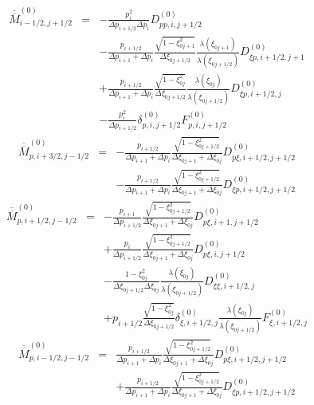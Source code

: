 \begin{eqnarray*}
\overline{\overline{M}}_{i-1/2,j+1/2}^{\left(0\right)} & = & -\frac{p_{i}^{2}}{\Delta p_{i+1/2}\Delta p_{i}}D_{pp,i,j+1/2}^{\left(0\right)}\\
 &  & -\frac{p_{i+1/2}}{\Delta p_{i+1}+\Delta p_{i}}\frac{\sqrt{1-\xi_{0j+1}^{2}}}{\Delta\xi_{0j+1/2}}\frac{\lambda\left(\xi_{0j+1}\right)}{\lambda\left(\xi_{0j+1/2}\right)}D_{\xi p,i+1/2,j+1}^{\left(0\right)}\\
 &  & +\frac{p_{i+1/2}}{\Delta p_{i+1}+\Delta p_{i}}\frac{\sqrt{1-\xi_{0j}^{2}}}{\Delta\xi_{0j+1/2}}\frac{\lambda\left(\xi_{0j}\right)}{\lambda\left(\xi_{0j+1/2}\right)}D_{\xi p,i+1/2,j}^{\left(0\right)}\\
 &  & -\frac{p_{i}^{2}}{\Delta p_{i+1/2}}\delta_{p,i,j+1/2}^{\left(0\right)}F_{p,i,j+1/2}^{\left(0\right)}\end{eqnarray*}
\begin{eqnarray*}
\overline{\overline{M}}_{p,i+3/2,j-1/2}^{\left(0\right)} & = & -\frac{p_{i+1/2}}{\Delta p_{i+1}+\Delta p_{i}}\frac{\sqrt{1-\xi_{0j+1/2}^{2}}}{\Delta\xi_{0j+1}+\Delta\xi_{0j}}D_{p\xi,i+1/2,j+1/2}^{\left(0\right)}\\
 &  & -\frac{p_{i+1/2}}{\Delta p_{i+1}+\Delta p_{i}}\frac{\sqrt{1-\xi_{0j+1/2}^{2}}}{\Delta\xi_{0j+1}+\Delta\xi_{0j}}D_{\xi p,i+1/2,j+1/2}^{\left(0\right)}\end{eqnarray*}
\begin{eqnarray*}
\overline{\overline{M}}_{p,i+1/2,j-1/2}^{\left(0\right)} & = & -\frac{p_{i+1}}{\Delta p_{i+1/2}}\frac{\sqrt{1-\xi_{0j+1/2}^{2}}}{\Delta\xi_{0j+1}+\Delta\xi_{0j}}D_{p\xi,i+1,j+1/2}^{\left(0\right)}\\
 &  & +\frac{p_{i}}{\Delta p_{i+1/2}}\frac{\sqrt{1-\xi_{0j+1/2}^{2}}}{\Delta\xi_{0j+1}+\Delta\xi_{0j}}D_{p\xi,i,j+1/2}^{\left(0\right)}\\
 &  & -\frac{1-\xi_{0j}^{2}}{\Delta\xi_{0j+1/2}\Delta\xi_{0j}}\frac{\lambda\left(\xi_{0j}\right)}{\lambda\left(\xi_{0j+1/2}\right)}D_{\xi\xi,i+1/2,j}^{\left(0\right)}\\
 &  & +p_{i+1/2}\frac{\sqrt{1-\xi_{0j}^{2}}}{\Delta\xi_{0j+1/2}}\delta_{\xi,i+1/2,j}^{\left(0\right)}\frac{\lambda\left(\xi_{0j}\right)}{\lambda\left(\xi_{0j+1/2}\right)}F_{\xi,i+1/2,j}^{\left(0\right)}\end{eqnarray*}
\begin{eqnarray*}
\overline{\overline{M}}_{p,i-1/2,j-1/2}^{\left(0\right)} & = & \frac{p_{i+1/2}}{\Delta p_{i+1}+\Delta p_{i}}\frac{\sqrt{1-\xi_{0j+1/2}^{2}}}{\Delta\xi_{0j+1}+\Delta\xi_{0j}}D_{p\xi,i+1/2,j+1/2}^{\left(0\right)}\\
 &  & +\frac{p_{i+1/2}}{\Delta p_{i+1}+\Delta p_{i}}\frac{\sqrt{1-\xi_{0j+1/2}^{2}}}{\Delta\xi_{0j+1}+\Delta\xi_{0j}}D_{\xi p,i+1/2,j+1/2}^{\left(0\right)}\end{eqnarray*}
